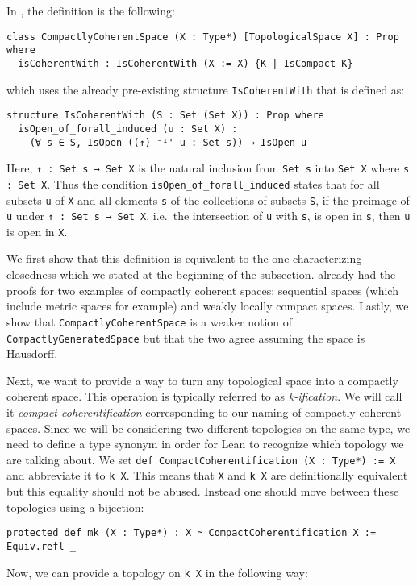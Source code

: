 In \mathlib, the definition is the following: 

\begin{lstlisting}[frame=single]
class CompactlyCoherentSpace (X : Type*) [TopologicalSpace X] : Prop where
  isCoherentWith : IsCoherentWith (X := X) {K | IsCompact K}
\end{lstlisting}

which uses the already pre-existing structure \lstinline|IsCoherentWith| that is defined as: 

\begin{lstlisting}[frame=single]
structure IsCoherentWith (S : Set (Set X)) : Prop where
  isOpen_of_forall_induced (u : Set X) : 
    (∀ s ∈ S, IsOpen ((↑) ⁻¹' u : Set s)) → IsOpen u
\end{lstlisting}

Here, \lstinline|↑ : Set s → Set X| is the natural inclusion from \lstinline|Set s| into \lstinline|Set X| where \lstinline|s : Set X|. 
Thus the condition \lstinline|isOpen_of_forall_induced| states that for all subsets \lstinline|u| of \lstinline|X| and all elements \lstinline|s| of the collections of subsets \lstinline|S|, if the preimage of \lstinline|u| under \lstinline|↑ : Set s → Set X|, i.e.\ the intersection of \lstinline|u| with \lstinline|s|, is open in \lstinline|s|, then \lstinline|u| is open in \lstinline|X|.

We first show that this definition is equivalent to the one characterizing closedness which we stated at the beginning of the subsection. 
\mathlib already had the proofs for two examples of compactly coherent spaces: sequential spaces (which include metric spaces for example) and weakly locally compact spaces. 
Lastly, we show that \lstinline|CompactlyCoherentSpace| is a weaker notion of \lstinline|CompactlyGeneratedSpace| but that the two agree assuming the space is Hausdorff.

Next, we want to provide a way to turn any topological space into a compactly coherent space. 
This operation is typically referred to as \emph{k-ification}. 
We will call it \emph{compact coherentification} corresponding to our naming of compactly coherent spaces. 
Since we will be considering two different topologies on the same type, we need to define a type synonym in order for Lean to recognize which topology we are talking about. 
We set \lstinline|def CompactCoherentification (X : Type*) := X| and abbreviate it to \lstinline|k X|. 
This means that \lstinline|X| and \lstinline|k X| are definitionally equivalent but this equality should not be abused. 
Instead one should move between these topologies using a bijection: 
\begin{lstlisting}[frame=single]
protected def mk (X : Type*) : X ≃ CompactCoherentification X := Equiv.refl _
\end{lstlisting}
Now, we can provide a topology on \lstinline|k X| in the following way: 

